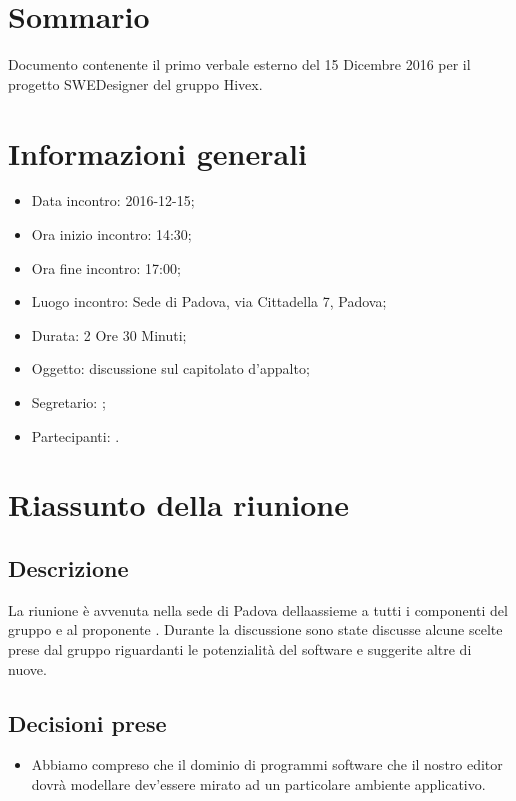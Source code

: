 


\section{Sommario}

 Documento contenente il primo verbale esterno del 15 Dicembre 2016 per il progetto SWEDesigner del gruppo Hivex.

\section{Informazioni generali}
\begin{itemize}
\item {Data incontro:} 2016-12-15;
\item {Ora inizio incontro:} 14:30;
\item {Ora fine incontro:} 17:00;
\item {Luogo incontro:} \ZU Sede di Padova, via Cittadella 7, Padova; 
\item {Durata:} 2 Ore 30 Minuti;
\item {Oggetto:} discussione sul capitolato d’appalto;
\item {Segretario:} 	\LS; 
\item {Partecipanti:} \GR.
\end{itemize}

\section{Riassunto della riunione}
\subsection{Descrizione} 
La riunione è avvenuta nella sede di Padova della\ZU assieme a tutti i componenti del gruppo e al proponente \GP. Durante la discussione sono state discusse alcune scelte prese dal gruppo riguardanti le potenzialità del software e suggerite altre di nuove.
\subsection{Decisioni prese} 
\begin{itemize}
\item Abbiamo compreso che il dominio di programmi software che il nostro editor dovrà modellare dev’essere mirato ad un particolare ambiente applicativo.
\end{itemize}


